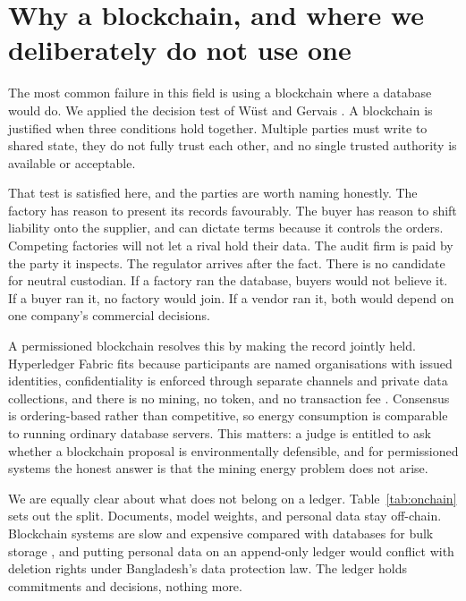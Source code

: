 \documentclass[11pt,a4paper]{article}
\begin{document}
\section{Why a blockchain, and where we deliberately do not use one}
\label{sec:whychain}

The most common failure in this field is using a blockchain where a database
would do. We applied the decision test of W\"{u}st and Gervais
\citep{wust2018blockchain}. A blockchain is justified when three conditions hold
together. Multiple parties must write to shared state, they do not fully trust
each other, and no single trusted authority is available or acceptable.

That test is satisfied here, and the parties are worth naming honestly. The
factory has reason to present its records favourably. The buyer has reason to
shift liability onto the supplier, and can dictate terms because it controls the
orders. Competing factories will not let a rival hold their data. The audit firm
is paid by the party it inspects. The regulator arrives after the fact. There is
no candidate for neutral custodian. If a factory ran the database, buyers would
not believe it. If a buyer ran it, no factory would join. If a vendor ran it,
both would depend on one company's commercial decisions.

A permissioned blockchain resolves this by making the record jointly held.
Hyperledger Fabric fits because participants are named organisations with issued
identities, confidentiality is enforced through separate channels and private
data collections, and there is no mining, no token, and no transaction fee
\citep{androulaki2018fabric}. Consensus is ordering-based rather than
competitive, so energy consumption is comparable to running ordinary database
servers. This matters: a judge is entitled to ask whether a blockchain proposal
is environmentally defensible, and for permissioned systems the honest answer is
that the mining energy problem does not arise.

We are equally clear about what does not belong on a ledger. Table~\ref{tab:onchain}
sets out the split. Documents, model weights, and personal data stay off-chain.
Blockchain systems are slow and expensive compared with databases for bulk
storage \citep{dinh2018untangling}, and putting personal data on an
append-only ledger would conflict with deletion rights under Bangladesh's data
protection law. The ledger holds commitments and decisions, nothing more.
\end{document}
